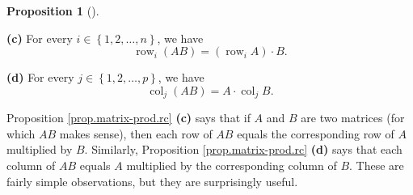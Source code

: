 \documentclass[numbers=enddot,12pt,final,onecolumn,notitlepage]{scrartcl}%
\theoremstyle{definition}
\newtheorem{prop}[theo]{Proposition}
\newenvironment{proposition}[1][]
{\begin{prop}[#1]\begin{leftbar}}
{\end{leftbar}\end{prop}}
\begin{document}
\begin{proposition}
\textbf{(c)} For every $i\in\left\{  1,2,\ldots,n\right\}  $, we have%
\[
\operatorname*{row}\nolimits_{i}\left(  AB\right)  =\left(
\operatorname*{row}\nolimits_{i}A\right)  \cdot B.
\]


\textbf{(d)} For every $j\in\left\{  1,2,\ldots,p\right\}  $, we have%
\[
\operatorname*{col}\nolimits_{j}\left(  AB\right)  =A\cdot\operatorname*{col}%
\nolimits_{j}B.
\]

\end{proposition}

Proposition \ref{prop.matrix-prod.rc} \textbf{(c)} says that if $A$ and $B$
are two matrices (for which $AB$ makes sense), then each row of $AB$ equals
the corresponding row of $A$ multiplied by $B$. Similarly, Proposition
\ref{prop.matrix-prod.rc} \textbf{(d)} says that each column of $AB$ equals
$A$ multiplied by the corresponding column of $B$. These are fairly simple
observations, but they are surprisingly useful.
\end{document}

